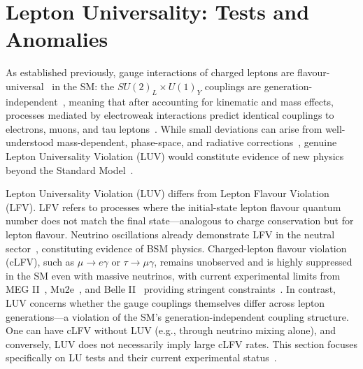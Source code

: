 \section{Lepton Universality: Tests and Anomalies}\label{sec:LU}

As established previously, gauge interactions of charged leptons are flavour-universal~\cite{gl1961579,PhysRevLett.19.1264,1674-1137-40-10-100001} in the SM: the $SU(2)_L\times U(1)_Y$ couplings are generation-independent~\cite{gl1961579,PhysRevLett.19.1264}, meaning that after accounting for kinematic and mass effects, processes mediated by electroweak interactions predict identical couplings to electrons, muons, and tau leptons~\cite{1674-1137-40-10-100001}. While small deviations can arise from well-understood mass-dependent, phase-space, and radiative corrections~\cite{1674-1137-40-10-100001}, genuine Lepton Universality Violation (LUV) would constitute evidence of new physics beyond the Standard Model~\cite{Hiller:2014yaa,Dorsner:2016wpm,Buttazzo:2017ixm}.

Lepton Universality Violation (LUV) differs from Lepton Flavour Violation (LFV). LFV refers to processes where the initial-state lepton flavour quantum number does not match the final state---analogous to charge conservation but for lepton flavour. Neutrino oscillations already demonstrate LFV in the neutral sector~\cite{SuperK:1998osc,SNO:2002NC}, constituting evidence of BSM physics. Charged-lepton flavour violation (cLFV), such as $\mu\to e\gamma$ or $\tau\to\mu\gamma$, remains unobserved and is highly suppressed in the SM even with massive neutrinos, with current experimental limits from MEG II~\cite{MEGII:2025gzr}, Mu2e~\cite{Ganguly:2022ufq}, and Belle II~\cite{Belle-II:2018jsg} providing stringent constraints~\cite{1674-1137-40-10-100001}. In contrast, LUV concerns whether the gauge couplings themselves differ across lepton generations---a violation of the SM's generation-independent coupling structure. One can have cLFV without LUV (e.g., through neutrino mixing alone), and conversely, LUV does not necessarily imply large cLFV rates. This section focuses specifically on LU tests and their current experimental status~\cite{1674-1137-40-10-100001,Ciuchini:2022wbq}.

